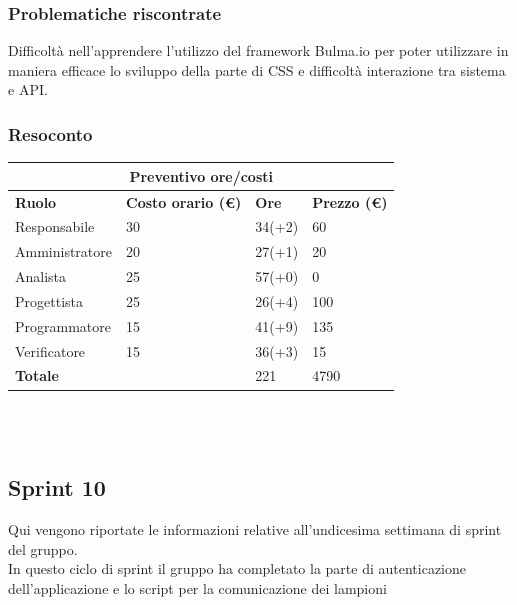 \documentclass[12pt]{article}
\begin{document}
\subsubsection{Problematiche riscontrate}
Difficoltà nell’apprendere l’utilizzo del framework Bulma.io per poter utilizzare in maniera efficace lo sviluppo della parte di CSS e difficoltà interazione tra sistema e API.


\subsubsection{Resoconto}
\begin{center}
	\begin{tabularx}{\textwidth}{|X|X|X|X|}
		\hline
		\multicolumn{4}{|c|}{\textbf{Preventivo ore/costi}}                                      \\
		\hline
		\hline
		\textbf{Ruolo}  & \textbf{Costo orario (\euro)} & \textbf{Ore} & \textbf{Prezzo (\euro)} \\
		\hline
		Responsabile    & 30                            & 34(+2)       & 60                      \\
		\hline
		Amministratore  & 20                            & 27(+1)       & 20                      \\
		\hline
		Analista        & 25                            & 57(+0)       & 0                       \\
		\hline
		Progettista     & 25                            & 26(+4)       & 100                     \\
		\hline
		Programmatore   & 15                            & 41(+9)       & 135                     \\
		\hline
		Verificatore    & 15                            & 36(+3)       & 15                      \\
		\hline
		\hline
		\textbf{Totale} &                               & 221          & 4790                    \\
		\hline
	\end{tabularx}\\[8pt]
	\mbox{}\\
\end{center}

\subsection{Sprint 10}
Qui vengono riportate le informazioni relative all'undicesima settimana di sprint del gruppo. \\
In questo ciclo di sprint il gruppo ha completato la parte di autenticazione dell'applicazione e lo script per la comunicazione dei lampioni \\
\end{document}
